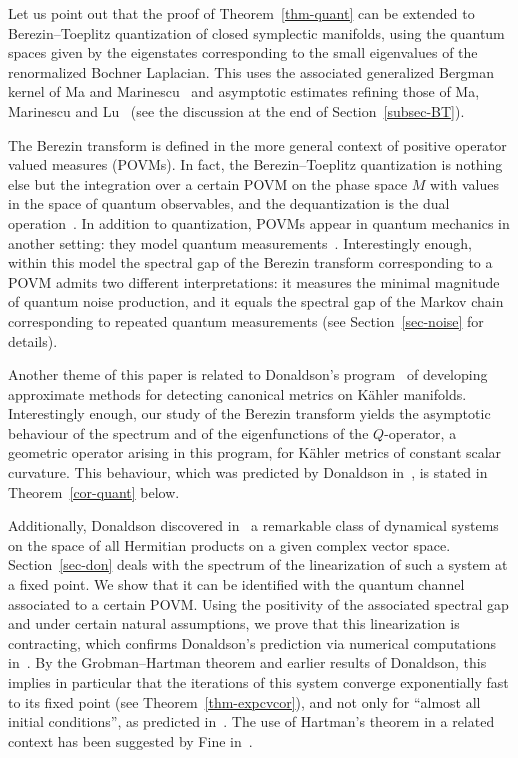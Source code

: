 \documentclass[11pt]{article}
\theoremstyle{definition}
\numberwithin{equation}{section}
\numberwithin{figure}{section}
\numberwithin{table}{section}
\newcommand\< {\mathcal{h}}
\renewcommand\> {\mathcal{i}}
\begin{document}
Let us point out that the proof of Theorem~\ref{thm-quant} can be extended to Berezin--Toeplitz quantization of closed symplectic manifolds, using the quantum spaces given by the eigenstates corresponding to the small eigenvalues of the renormalized Bochner Laplacian. This uses the associated generalized Bergman kernel of Ma and Marinescu~\cite{MM08} and asymptotic estimates refining those of Ma, Marinescu and Lu~\cite{LMM16} (see the discussion at the end of Section~\ref{subsec-BT}).


The Berezin transform is defined in the more general context of positive operator valued measures (POVMs). In fact, the Berezin--Toeplitz quantization is nothing else but the integration over a certain POVM on the phase space $M$ with values in the space of quantum observables, and the dequantization is the dual operation~\cite{CP,La}. In addition to quantization, POVMs appear in quantum mechanics in another setting: they model quantum measurements~\cite{Busch-2}. Interestingly enough, within this model the spectral gap of the Berezin transform corresponding to a POVM admits two different interpretations: it measures the minimal magnitude of quantum noise production, and it equals the spectral gap of the Markov chain corresponding to repeated quantum measurements (see Section~\ref{sec-noise} for details).


Another theme of this paper is related to Donaldson's program~\cite{D} of developing approximate methods for detecting canonical metrics on K\"ahler manifolds. Interestingly enough, our study of the Berezin transform yields the asymptotic behaviour of the spectrum and of the eigenfunctions of the $Q$-operator, a geometric operator arising in this program, for K\"ahler metrics of constant scalar curvature. This behaviour, which was predicted by Donaldson in~\cite{D}, is stated in Theorem~\ref{cor-quant} below.

Additionally, Donaldson discovered in~\cite{D} a remarkable class of dynamical systems on the space of all Hermitian products on a given complex vector space. Section~\ref{sec-don} deals with the spectrum of the linearization of such a system at a fixed point. We show that it can be identified with the quantum channel associated to a certain POVM. Using the positivity of the associated spectral gap and under certain natural assumptions, we prove that this linearization is contracting, which confirms Donaldson's prediction via numerical computations in~\cite[Section~3]{D}. By the Grobman--Hartman theorem and earlier results of Donaldson, this implies in particular that the iterations of this system converge exponentially fast to its fixed point (see Theorem~\ref{thm-expcvcor}), and not only for ``almost all initial conditions'', as predicted in~\cite[Section~4.1]{D}. The use of Hartman's theorem in a related context has been suggested by Fine in~\cite{Fin12}.
\end{document}
